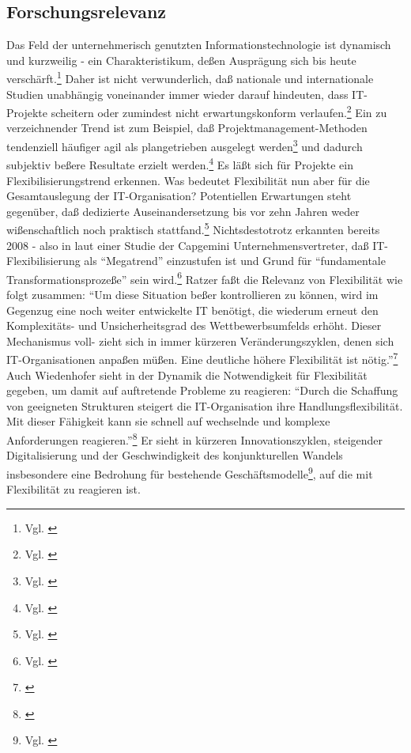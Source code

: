 \subsection{Forschungsrelevanz}
Das Feld der unternehmerisch genutzten Informationstechnologie ist dynamisch und kurzweilig - ein Charakteristikum, de{\ss}en Auspr\"agung sich bis heute versch\"arft.\footnote{Vgl. \cite[S.15]{capgemini2019}} 
Daher ist nicht verwunderlich, da{\ss} nationale und internationale Studien unabh\"angig voneinander immer wieder darauf hindeuten, dass IT-Projekte scheitern oder zumindest nicht erwartungskonform verlaufen.\footnote{Vgl. \cite[S.172]{fischer2016}}\newline
Ein zu verzeichnender Trend ist zum Beispiel, da{\ss} Projektmanagement-Methoden tendenziell h\"aufiger agil als plangetrieben ausgelegt werden\footnote{Vgl. \cite[S.12]{statusquoagile2015}} und dadurch subjektiv be{\ss}ere Resultate erzielt werden.\footnote{Vgl. \cite[S.22]{statusquoagile2015}} 
Es l\"a{\ss}t sich f\"ur Projekte ein Flexibilisierungstrend erkennen.\newline
Was bedeutet Flexibilit\"at nun aber f\"ur die Gesamtauslegung der IT-Organisation?
Potentiellen Erwartungen steht gegen\"uber, da{\ss} dedizierte Auseinandersetzung bis vor zehn Jahren weder wi{\ss}enschaftlich noch praktisch stattfand.\footnote{Vgl. \cite[S.53]{radermacher2009}} 
Nichtsdestotrotz erkannten bereits 2008 - also in laut einer Studie der Capgemini Unternehmensvertreter, da{\ss} IT-Flexibilisierung als ``Megatrend'' einzustufen ist und Grund f\"ur ``fundamentale Transformationsproze{\ss}e'' sein wird.\footnote{Vgl. \cite[S.17]{capgemini2008}}
Ratzer fa{\ss}t die Relevanz von Flexibilit\"at wie folgt zusammen: ``Um diese Situation be{\ss}er kontrollieren zu k\"onnen, wird im Gegenzug eine noch weiter entwickelte IT ben\"otigt, die wiederum erneut den Komplexit\"ats- und Unsicherheitsgrad des Wettbewerbsumfelds erh\"oht. 
Dieser Mechanismus voll- zieht sich in immer k\"urzeren Ver\"anderungszyklen, denen sich IT-Organisationen anpa{\ss}en m\"u{\ss}en. 
Eine deutliche h\"ohere Flexibilit\"at ist n\"otig.''\footnote{\cite{ratzer2009}}
Auch Wiedenhofer sieht in der Dynamik die Notwendigkeit f\"ur Flexibilit\"at gegeben, um damit auf auftretende Probleme zu reagieren: ``Durch die Schaffung von geeigneten Strukturen steigert die IT-Organisation ihre Handlungsflexibilit\"at. 
Mit dieser F\"ahigkeit kann sie schnell auf wechselnde und komplexe Anforderungen reagieren.''\footnote{\cite[S.236]{Wiedenhofer2016}}
Er sieht in k\"urzeren Innovationszyklen, steigender Digitalisierung und der Geschwindigkeit des konjunkturellen Wandels insbesondere eine Bedrohung f\"ur bestehende Gesch\"aftsmodelle\footnote{Vgl. \cite[S.237]{Wiedenhofer2016}}, auf die mit Flexibilit\"at zu reagieren ist.\newline
